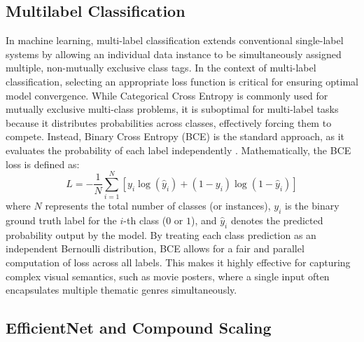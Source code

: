 \documentclass[conference]{IEEEtran}
\begin{document}
\subsection{Multilabel Classification}
In machine learning, multi-label classification extends conventional single-label systems by allowing an individual data instance to be simultaneously assigned multiple, non-mutually exclusive class tags. In the context of multi-label classification, selecting an appropriate loss function is critical for ensuring optimal model convergence. While Categorical Cross Entropy is commonly used for mutually exclusive multi-class problems, it is suboptimal for multi-label tasks because it distributes probabilities across classes, effectively forcing them to compete. Instead, Binary Cross Entropy (BCE) is the standard approach, as it evaluates the probability of each label independently \cite{b7}.
Mathematically, the BCE loss is defined as:
$$L = -\frac{1}{N} \sum_{i=1}^{N} \left[ y_i \log(\hat{y}_i) + (1 - y_i) \log(1 - \hat{y}_i) \right]$$
where $N$ represents the total number of classes (or instances), $y_i$ is the binary ground truth label for the $i$-th class ($0$ or $1$), and $\hat{y}_i$ denotes the predicted probability output by the model. By treating each class prediction as an independent Bernoulli distribution, BCE allows for a fair and parallel computation of loss across all labels. This makes it highly effective for capturing complex visual semantics, such as movie posters, where a single input often encapsulates multiple thematic genres simultaneously.



\subsection{EfficientNet and Compound Scaling}
\end{document}
